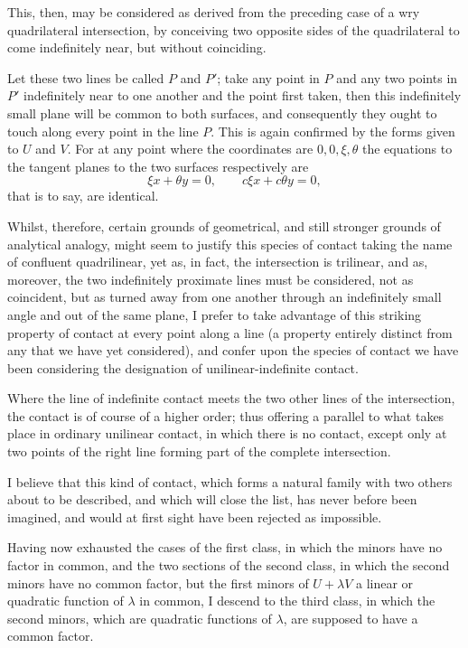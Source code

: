 \documentclass[11pt]{article}
\begin{document}
{{This, then, may be considered as derived from the preceding case of a wry quadrilateral intersection, by conceiving two opposite sides of the quadrilateral to come indefinitely near, but without coinciding.

Let these two lines be called $P$ and $P'$; take any point in $P$ and any two points in $P'$ indefinitely near to one another and the point first taken, then this indefinitely small plane will be common to both surfaces, and consequently they ought to touch along every point in the line $P$. This is again confirmed by the forms given to $U$ and $V$. For at any point where the coordinates are $0,0,\xi,\theta$ the equations to the tangent planes to the two surfaces respectively are
\[
\xi x+\theta y=0,
\qquad
c\xi x+c\theta y=0,
\]
that is to say, are identical.

Whilst, therefore, certain grounds of geometrical, and still stronger grounds of analytical analogy, might seem to justify this species of contact taking the name of confluent quadrilinear, yet as, in fact, the intersection is trilinear, and as, moreover, the two indefinitely proximate lines must be considered, not as coincident, but as turned away from one another through an indefinitely small angle and out of the same plane, I prefer to take advantage of this striking property of contact at every point along a line (a property entirely distinct from any that we have yet considered), and confer upon the species of contact we have been considering the designation of unilinear-indefinite contact.

Where the line of indefinite contact meets the two other lines of the intersection, the contact is of course of a higher order; thus offering a parallel to what takes place in ordinary unilinear contact, in which there is no contact, except only at two points of the right line forming part of the complete intersection.

I believe that this kind of contact, which forms a natural family with two others about to be described, and which will close the list, has never before been imagined, and would at first sight have been rejected as impossible.

Having now exhausted the cases of the first class, in which the minors have no factor in common, and the two sections of the second class, in which the second minors have no common factor, but the first minors of $U+\lambda V$ a linear or quadratic function of $\lambda$ in common, I descend to the third class, in which the second minors, which are quadratic functions of $\lambda$, are supposed to have a common factor.

}}
\end{document}
